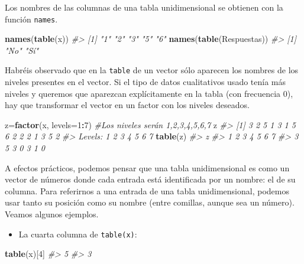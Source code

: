 \documentclass[
]{book}
\newenvironment{Shaded}{\begin{snugshade}}{\end{snugshade}}
\newcommand{\CommentTok}[1]{\textcolor[rgb]{0.56,0.35,0.01}{\textit{#1}}}
\newcommand{\DataTypeTok}[1]{\textcolor[rgb]{0.13,0.29,0.53}{#1}}
\newcommand{\DecValTok}[1]{\textcolor[rgb]{0.00,0.00,0.81}{#1}}
\newcommand{\KeywordTok}[1]{\textcolor[rgb]{0.13,0.29,0.53}{\textbf{#1}}}
\newcommand{\NormalTok}[1]{#1}
\newcommand{\OperatorTok}[1]{\textcolor[rgb]{0.81,0.36,0.00}{\textbf{#1}}}
\providecommand{\tightlist}{%
  \setlength{\itemsep}{0pt}\setlength{\parskip}{0pt}}
\theoremstyle{definition}
\theoremstyle{definition}
\theoremstyle{definition}
\theoremstyle{remark}
\begin{document}
Los nombres de las columnas de una tabla unidimensional se obtienen con la función \texttt{names}.

\begin{Shaded}
\begin{Highlighting}[]
\KeywordTok{names}\NormalTok{(}\KeywordTok{table}\NormalTok{(x))}
\CommentTok{\#\textgreater{} [1] "1" "2" "3" "5" "6"}
\KeywordTok{names}\NormalTok{(}\KeywordTok{table}\NormalTok{(Respuestas))}
\CommentTok{\#\textgreater{} [1] "No" "Sí"}
\end{Highlighting}
\end{Shaded}

Habréis observado que en la \texttt{table} de un vector sólo aparecen los nombres de los niveles presentes en el vector. Si el tipo de datos cualitativos usado tenía más niveles y queremos que aparezcan explícitamente en la tabla (con frecuencia 0), hay que transformar el vector en un factor con los niveles deseados.

\begin{Shaded}
\begin{Highlighting}[]
\NormalTok{z=}\KeywordTok{factor}\NormalTok{(x, }\DataTypeTok{levels=}\DecValTok{1}\OperatorTok{:}\DecValTok{7}\NormalTok{)  }\CommentTok{\#Los niveles serán 1,2,3,4,5,6,7}
\NormalTok{z}
\CommentTok{\#\textgreater{}  [1] 3 2 5 1 3 1 5 6 2 2 2 1 3 5 2}
\CommentTok{\#\textgreater{} Levels: 1 2 3 4 5 6 7}
\KeywordTok{table}\NormalTok{(z)}
\CommentTok{\#\textgreater{} z}
\CommentTok{\#\textgreater{} 1 2 3 4 5 6 7 }
\CommentTok{\#\textgreater{} 3 5 3 0 3 1 0}
\end{Highlighting}
\end{Shaded}

A efectos prácticos, podemos pensar que una tabla unidimensional es como un vector de números donde cada entrada está identificada por un nombre: el de su columna. Para referirnos a una entrada de una tabla unidimensional, podemos usar tanto su posición como su nombre (entre comillas, aunque sea un número). Veamos algunos ejemplos.

\begin{itemize}
\tightlist
\item
  La cuarta columna de \texttt{table(x)}:
\end{itemize}

\begin{Shaded}
\begin{Highlighting}[]
\KeywordTok{table}\NormalTok{(x)[}\DecValTok{4}\NormalTok{] }
\CommentTok{\#\textgreater{} 5 }
\CommentTok{\#\textgreater{} 3}
\end{Highlighting}
\end{Shaded}
\end{document}
